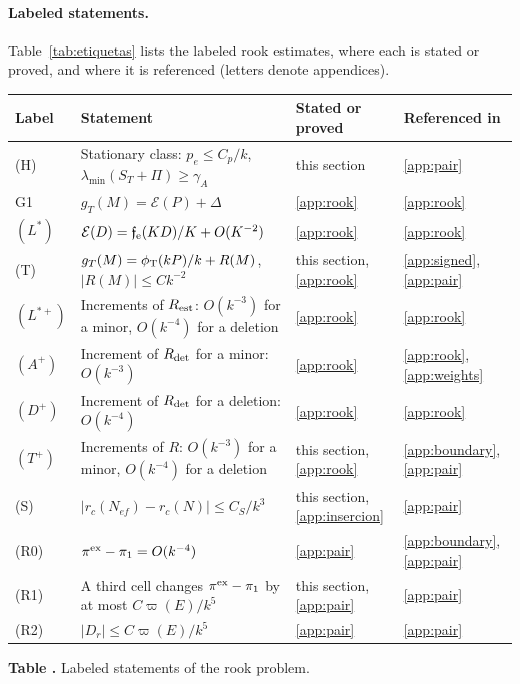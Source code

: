 \paragraph{Labeled statements.} Table~\ref{tab:etiquetas} lists the labeled rook estimates, where each is
stated or proved, and where it is referenced (letters denote appendices).
\begin{center}\small
\begin{tabular}{@{}L{.07\linewidth}L{.47\linewidth}L{.17\linewidth}L{.19\linewidth}@{}}
\toprule Label & Statement & Stated or proved & Referenced in\\ \midrule
(H) & Stationary class: $p_e\le C_p/k$, $\lambda_{\min}(S_T+\Pi)\ge\gamma_A$ & this section &
 \ref{app:pair}\\
G1 & $g_T(M)=\mathcal E(P)+\Delta$ & \ref{app:rook} & \ref{app:rook}\\
$(L^*)$ & $\mathcal E(D)=\mathfrak f_{\rm e}(KD)/K+O(K^{-2})$ & \ref{app:rook} & \ref{app:rook}\\
(T) & $g_T(M)=\phi_{\mathrm T}(kP)/k+R(M)$, $|R(M)|\le Ck^{-2}$ & this section, \ref{app:rook} &
 \ref{app:signed}, \ref{app:pair}\\
$(L^{*+})$ & Increments of $R_{\rm est}$: $O(k^{-3})$ for a minor, $O(k^{-4})$ for a deletion &
 \ref{app:rook} & \ref{app:rook}\\
$(A^+)$ & Increment of $R_{\rm det}$ for a minor: $O(k^{-3})$ & \ref{app:rook} &
 \ref{app:rook}, \ref{app:weights}\\
$(D^+)$ & Increment of $R_{\rm det}$ for a deletion: $O(k^{-4})$ & \ref{app:rook} & \ref{app:rook}\\
$(T^+)$ & Increments of $R$: $O(k^{-3})$ for a minor, $O(k^{-4})$ for a deletion &
 this section, \ref{app:rook} & \ref{app:boundary}, \ref{app:pair}\\
(S) & $|r_c(N_{ef})-r_c(N)|\le C_S/k^3$ & this section, \ref{app:insercion} & \ref{app:pair}\\
(R0) & $\pi^{\rm ex}-\pi_1=O(k^{-4})$ & \ref{app:pair} & \ref{app:boundary}, \ref{app:pair}\\
(R1) & A third cell changes $\pi^{\rm ex}-\pi_1$ by at most $C\varpi(E)/k^5$ &
 this section, \ref{app:pair} & \ref{app:pair}\\
(R2) & $|D_r|\le C\varpi(E)/k^5$ & \ref{app:pair} & \ref{app:pair}\\
\bottomrule
\end{tabular}
\label{tab:etiquetas}\par\smallskip
\textbf{Table \thetable.} Labeled statements of the rook problem.
\end{center}
